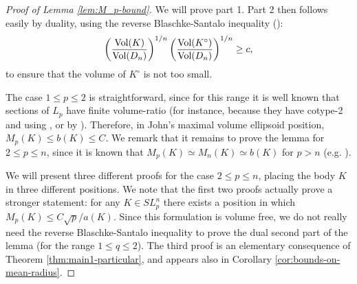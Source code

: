 \documentclass[12pt,oneside]{amsart}
\theoremstyle{definition}
\theoremstyle{remark}
\theoremstyle{proof}
\numberwithin{equation}{section}
\newcommand{\norm}[1]{\left\Vert#1\right\Vert}
\newcommand{\brac}[1]{\left(#1\right)}
\newcommand{\Vol}[1]{\textnormal{Vol} (#1)}
\newcommand{\VolRatio}[2]{\brac{\frac{\Vol{#1}}{\Vol{#2}}}^{1/n}}
\begin{document}
\begin{proof}[Proof of Lemma \ref{lem:M_p-bound}]
We will prove part 1. Part 2 then follows easily by duality,
using the reverse Blaschke-Santalo inequality
(\cite{Bourgain-Milman-vr-and-reverse-santalo}):
\begin{equation} \label{eq:reverse-Santalo}
\VolRatio{K}{D_n} \VolRatio{K^\circ}{D_n} \geq c,
\end{equation}
to ensure that the volume of $K^\circ$ is not too small.

The case $1\leq p \leq 2$ is straightforward, since for this range
it is well known that sections of $L_p$ have finite volume-ratio
(for instance, because they have cotype-2 and using
\cite{Bourgain-Milman-vr-and-reverse-santalo}, or by
\cite{Ball-Volume-Ratios}). Therefore, in John's maximal volume
ellipsoid position, $M_p(K) \leq b(K) \leq C$. We remark that it
remains to prove the lemma for $2 \leq p \leq n$, since it is
known that $M_p(K) \simeq M_n(K) \simeq b(K)$ for $p>n$ (e.g.
\cite{LMS}).

We will present three different proofs for the case $2\leq p \leq
n$, placing the body $K$ in three different positions. We note
that the first two proofs actually prove a stronger statement:
for any $K \in SL_p^n$ there exists a position in which $M_p(K)
\leq C \sqrt{p} / a(K)$. Since this formulation is volume free,
we do not really need the reverse Blaschke-Santalo inequality to
prove the dual second part of the lemma (for the range $1\leq
q\leq 2$). The third proof is an elementary consequence of Theorem
\ref{thm:main1-particular}, and appears also in Corollary
\ref{cor:bounds-on-mean-radius}.



\end{proof}
\end{document}
